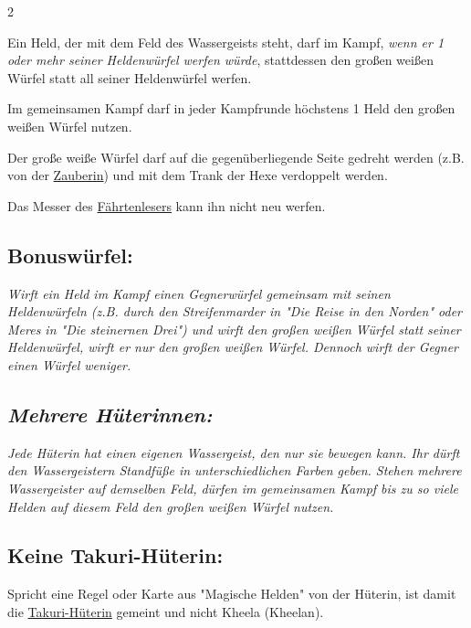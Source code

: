 \documentclass[10pt, a4paper, oneside]{book}
\newcommand{\fan}[1]{\textit{#1}}
\begin{document}
\begin{multicols*}{2}
\begin{nobgcolor}
Ein Held, der mit dem Feld des Wassergeists steht, darf im Kampf, \fan{wenn er 1 oder mehr seiner Heldenwürfel werfen würde}, stattdessen den großen weißen Würfel statt all seiner Heldenwürfel werfen.

Im gemeinsamen Kampf darf in jeder Kampfrunde höchstens 1 Held den großen weißen Würfel nutzen.
\supercite{5300}

Der große weiße Würfel darf auf die gegenüberliegende Seite gedreht werden (z.B. von der \hyperref[Zauberin]{Zauberin}\supercite{5335}) und mit dem Trank der Hexe verdoppelt werden.
\supercite{5325}

Das Messer des \hyperref[Fährtenleser]{Fährtenlesers} kann ihn nicht neu werfen.
\supercite{5460}




\subsection{Bonuswürfel:}

\fan{Wirft ein Held im Kampf einen Gegnerwürfel gemeinsam mit seinen Heldenwürfeln (z.B. durch den Streifenmarder in "Die Reise in den Norden" oder Meres in "Die steinernen Drei") und wirft den großen weißen Würfel statt seiner Heldenwürfel, wirft er nur den großen weißen Würfel. Dennoch wirft der Gegner einen Würfel weniger.}







\subsection{\fan{Mehrere Hüterinnen:}}

\fan{Jede Hüterin hat einen eigenen Wassergeist, den nur sie bewegen kann. Ihr dürft den Wassergeistern Standfüße in unterschiedlichen Farben geben. Stehen mehrere Wassergeister auf demselben Feld, dürfen im gemeinsamen Kampf bis zu so viele Helden auf diesem Feld den großen weißen Würfel nutzen.}




\subsection{Keine Takuri-Hüterin:}

Spricht eine Regel oder Karte aus "Magische Helden" von der Hüterin, ist damit die \hyperref[Takuri-Hüterin]{Takuri-Hüterin} gemeint und nicht Kheela (Kheelan).


\end{nobgcolor}
\end{multicols*}
\end{document}
